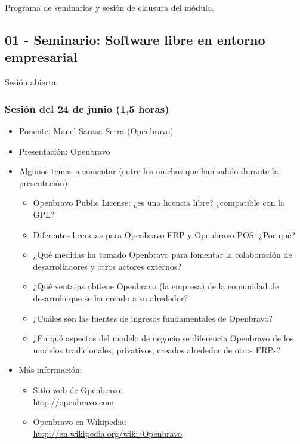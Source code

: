 \documentclass[a4paper,12pt]{article}
\begin{document}
Programa de seminarios y sesión de clausura del módulo.

\subsection{01 - Seminario: Software libre en entorno empresarial}

Sesión abierta.

\subsubsection{Sesión del 24 de junio (1,5 horas)}

\begin{itemize}
\item Ponente: Manel Sarasa Serra (Openbravo)
\item Presentación: Openbravo
\item Algunos temas a comentar (entre los muchos que han salido durante la presentación): 
  \begin{itemize}
  \item Openbravo Public License: ¿es una licencia libre? ¿compatible con la GPL?
  \item Diferentes licencias para Openbravo ERP y Openbravo POS. ¿Por qué?
  \item ¿Qué medidas ha tomado Openbravo para fomentar la colaboración de desarrolladores y otros actores externos?
  \item ¿Qué ventajas obtiene Openbravo (la empresa) de la comunidad de desarrolo que se ha creado a su alrededor?
  \item ¿Cuáles son las fuentes de ingresos fundamentales de Openbravo?
  \item ¿En qué aspectos del modelo de negocio se diferencia Openbravo de los modelos tradicionales, privativos, creados alrededor de otros ERPs?
  \end{itemize}
\item Más información:
  \begin{itemize}
  \item Sitio web de Openbravo: \\
    \url{http://openbravo.com}
  \item Openbravo en Wikipedia: \\
    \url{http://en.wikipedia.org/wiki/Openbravo}
  \end{itemize}
\end{itemize}
\end{document}
